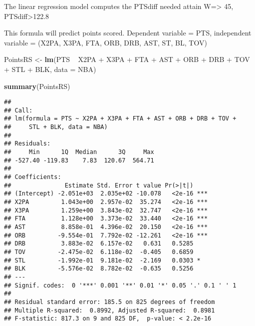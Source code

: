 \documentclass[]{article}
\newenvironment{Shaded}{\begin{snugshade}}{\end{snugshade}}
\newcommand{\KeywordTok}[1]{\textcolor[rgb]{0.13,0.29,0.53}{\textbf{{#1}}}}
\newcommand{\DataTypeTok}[1]{\textcolor[rgb]{0.13,0.29,0.53}{{#1}}}
\newcommand{\DecValTok}[1]{\textcolor[rgb]{0.00,0.00,0.81}{{#1}}}
\newcommand{\FloatTok}[1]{\textcolor[rgb]{0.00,0.00,0.81}{{#1}}}
\newcommand{\StringTok}[1]{\textcolor[rgb]{0.31,0.60,0.02}{{#1}}}
\newcommand{\NormalTok}[1]{{#1}}
\begin{document}
\begin{Shaded}
\end{Shaded}

The linear regression model computes the PTSdiff needed attain
W=\textgreater{} 45, PTSdiff\textgreater{}122.8

This formula will predict points scored. Dependent variable = PTS,
independent variable = (X2PA, X3PA, FTA, ORB, DRB, AST, ST, BL, TOV)

\begin{Shaded}
\begin{Highlighting}[]
\NormalTok{PointsRS <-}\StringTok{ }\KeywordTok{lm}\NormalTok{(PTS ~}\StringTok{ }\NormalTok{X2PA +}\StringTok{ }\NormalTok{X3PA +}\StringTok{ }\NormalTok{FTA +}\StringTok{ }\NormalTok{AST +}\StringTok{ }\NormalTok{ORB +}\StringTok{ }\NormalTok{DRB +}\StringTok{ }\NormalTok{TOV +}\StringTok{ }\NormalTok{STL +}\StringTok{ }\NormalTok{BLK, }\DataTypeTok{data =} \NormalTok{NBA)}

\KeywordTok{summary}\NormalTok{(PointsRS)}
\end{Highlighting}
\end{Shaded}

\begin{verbatim}
## 
## Call:
## lm(formula = PTS ~ X2PA + X3PA + FTA + AST + ORB + DRB + TOV + 
##     STL + BLK, data = NBA)
## 
## Residuals:
##     Min      1Q  Median      3Q     Max 
## -527.40 -119.83    7.83  120.67  564.71 
## 
## Coefficients:
##               Estimate Std. Error t value Pr(>|t|)    
## (Intercept) -2.051e+03  2.035e+02 -10.078   <2e-16 ***
## X2PA         1.043e+00  2.957e-02  35.274   <2e-16 ***
## X3PA         1.259e+00  3.843e-02  32.747   <2e-16 ***
## FTA          1.128e+00  3.373e-02  33.440   <2e-16 ***
## AST          8.858e-01  4.396e-02  20.150   <2e-16 ***
## ORB         -9.554e-01  7.792e-02 -12.261   <2e-16 ***
## DRB          3.883e-02  6.157e-02   0.631   0.5285    
## TOV         -2.475e-02  6.118e-02  -0.405   0.6859    
## STL         -1.992e-01  9.181e-02  -2.169   0.0303 *  
## BLK         -5.576e-02  8.782e-02  -0.635   0.5256    
## ---
## Signif. codes:  0 '***' 0.001 '**' 0.01 '*' 0.05 '.' 0.1 ' ' 1
## 
## Residual standard error: 185.5 on 825 degrees of freedom
## Multiple R-squared:  0.8992, Adjusted R-squared:  0.8981 
## F-statistic: 817.3 on 9 and 825 DF,  p-value: < 2.2e-16
\end{verbatim}
\end{document}
